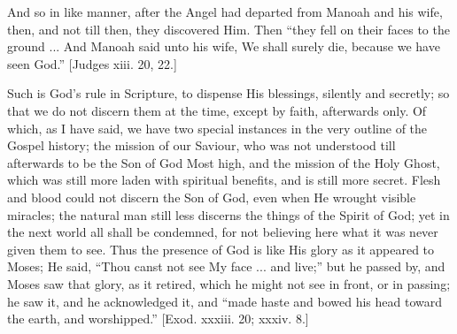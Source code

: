 And so in like manner, after the Angel had departed from Manoah and
his wife, then, and not till then, they discovered Him. Then
``they fell on their faces to the ground ... And Manoah said unto
his wife, We shall surely die, because we have seen God.'' [Judges
xiii. 20, 22.]

Such is God's rule in Scripture, to dispense His blessings,
silently and secretly; so that we do not discern them at the time,
except by faith, afterwards only. Of which, as I have said, we have
two special instances in the very outline of the Gospel history; the
mission of our Saviour, who was not understood till afterwards to be
the Son of God Most high, and the mission of the Holy Ghost, which was
still more laden with spiritual benefits, and is still more secret.
Flesh and blood could not discern the Son of God, even when He wrought
visible miracles; the natural man still less discerns the things of
the Spirit of God; yet in the next world all shall be condemned, for
not believing here what it was never given them to see. Thus the
presence of God is like His glory as it appeared to Moses; He said,
``Thou canst not see My face ... and live;'' but he passed by,
and Moses saw that glory, as it retired, which he might not see in
front, or in passing; he saw it, and he acknowledged it, and
``made haste and bowed his head toward the earth, and
worshipped.'' [Exod. xxxiii. 20; xxxiv. 8.]

